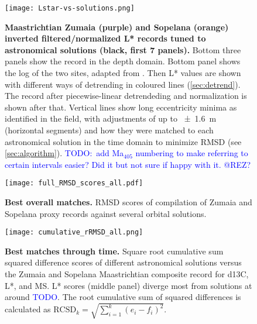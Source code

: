 \documentclass[draft]{agujournal2019}
\newcommand{\ma}[1]{Ma\(_{405}\)#1} %
\newcommand{\ijk}{\textcolor{blue}}
\begin{document}
\begin{figure}[htb]
  \centering
  \texttt{[image: Lstar-vs-solutions.png]}
  \caption{\label{fig:rolling-depth-age}
    \textbf{Maastrichtian Zumaia (purple) and Sopelana (orange) inverted filtered/normalized \gls{L*} records tuned to astronomical solutions (black, first 7 panels).}
    Bottom three panels show the record in the depth domain.
    Bottom panel shows the log of the two sites, adapted from .
    Then \gls{L*} values are shown with different ways of detrending in coloured lines (\cref{sec:detrend}).
    The record after piecewise-linear detrendeding and normalization is shown after that.
    Vertical lines show long eccentricity minima as identified in the field,
    with adjustments of up to \qty{\pm1.6}{\metre} (horizontal segments)
    and how they were matched to each astronomical solution in the time domain to minimize \gls{RMSD} (see \cref{sec:algorithm}).
    \ijk{TODO:\ add \ma{} numbering to make referring to certain intervals easier? Did it but not sure if happy with it. @REZ?}
    }
\end{figure}


\begin{figure}[htb]
    \centering
    \texttt{[image: full\_RMSD\_scores\_all.pdf]}
    \caption{\label{fig:full-RMSD-all} %
      \textbf{Best overall matches.}
        \gls{RMSD} scores of compilation of Zumaia and Sopelana proxy records against several orbital solutions.
    }
\end{figure}

\begin{figure}[htb]
  \centering
  \texttt{[image: cumulative\_rRMSD\_all.png]}
  \caption{\label{fig:cum-RMSD-all}
    \textbf{Best matches through time.}
    Square root cumulative sum squared difference scores of
    different astronomical solutions versus the Zumaia and Sopelana Maastrichtian composite record
    for \gls{d13C}, \gls{L*}, and \gls{MS}.
    \gls{L*} scores (middle panel) diverge most from solutions at around \ijk{TODO}.
    The root cumulative sum of squared differences is calculated as \(\text{RCSD}_{k} = \sqrt{\sum_{i=1}^{k}(e_{i} - f_{i})^{2}}\).
  }
\end{figure}
\end{document}
